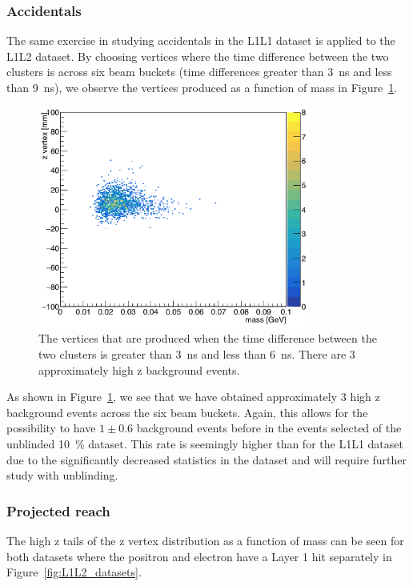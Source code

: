 \subsubsection{Accidentals}

The same exercise in studying accidentals in the L1L1 dataset is applied to the L1L2 dataset. By choosing vertices where the time difference between the two clusters is across six beam buckets (time differences greater than 3~ns and less than 9~ns), we observe the vertices produced as a function of mass in Figure~\ref{fig:zVmAcc_l1l2}.

\begin{figure}[H]
  \centering
      \includegraphics[width=0.8\textwidth]{plots/zVm_acc_L1L2.png}
  \caption{The vertices that are produced when the time difference between the two clusters is greater than 3~ns and less than 6~ns. There are 3 approximately high z background events.}
  \label{fig:zVmAcc_l1l2}
\end{figure} 

As shown in Figure~\ref{fig:zVmAcc_l1l2}, we see that we have obtained approximately 3 high z background events across the six beam buckets. Again, this allows for the possibility to have $1\pm0.6$ background events before in the events selected of the unblinded 10~$\%$ dataset. This rate is seemingly higher than for the L1L1 dataset due to the significantly decreased statistics in the dataset and will require further study with unblinding. 


\subsubsection{Projected reach}

The high z tails of the z vertex distribution as a function of mass can be seen for both datasets where the positron and electron have a Layer 1 hit separately in Figure~\ref{fig:L1L2_datasets}.


